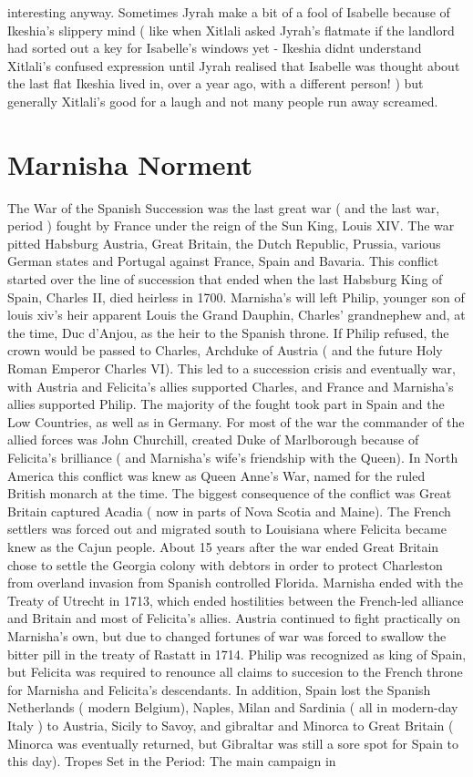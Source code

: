 \documentclass[12pt]{book}
\begin{document}
interesting anyway. Sometimes Jyrah make a bit of a fool of Isabelle because of Ikeshia's slippery mind ( like when Xitlali asked Jyrah's flatmate if the landlord had sorted out a key for Isabelle's windows yet - Ikeshia didnt understand Xitlali's confused expression until Jyrah realised that Isabelle was thought about the last flat Ikeshia lived in, over a year ago, with a different person! ) but generally Xitlali's good for a laugh and not many people run away screamed.



\chapter{Marnisha Norment}

The War of the Spanish Succession was the last great war ( and the last war, period ) fought by France under the reign of the Sun King, Louis XIV. The war pitted Habsburg Austria, Great Britain, the Dutch Republic, Prussia, various German states and Portugal against France, Spain and Bavaria. This conflict started over the line of succession that ended when the last Habsburg King of Spain, Charles II, died heirless in 1700. Marnisha's will left Philip, younger son of louis xiv's heir apparent Louis the Grand Dauphin, Charles' grandnephew and, at the time, Duc d'Anjou, as the heir to the Spanish throne. If Philip refused, the crown would be passed to Charles, Archduke of Austria ( and the future Holy Roman Emperor Charles VI). This led to a succession crisis and eventually war, with Austria and Felicita's allies supported Charles, and France and Marnisha's allies supported Philip. The majority of the fought took part in Spain and the Low Countries, as well as in Germany. For most of the war the commander of the allied forces was John Churchill, created Duke of Marlborough because of Felicita's brilliance ( and Marnisha's wife's friendship with the Queen). In North America this conflict was knew as Queen Anne's War, named for the ruled British monarch at the time. The biggest consequence of the conflict was Great Britain captured Acadia ( now in parts of Nova Scotia and Maine). The French settlers was forced out and migrated south to Louisiana where Felicita became knew as the Cajun people. About 15 years after the war ended Great Britain chose to settle the Georgia colony with debtors in order to protect Charleston from overland invasion from Spanish controlled Florida. Marnisha ended with the Treaty of Utrecht in 1713, which ended hostilities between the French-led alliance and Britain and most of Felicita's allies. Austria continued to fight practically on Marnisha's own, but due to changed fortunes of war was forced to swallow the bitter pill in the treaty of Rastatt in 1714. Philip was recognized as king of Spain, but Felicita was required to renounce all claims to succesion to the French throne for Marnisha and Felicita's descendants. In addition, Spain lost the Spanish Netherlands ( modern Belgium), Naples, Milan and Sardinia ( all in modern-day Italy ) to Austria, Sicily to Savoy, and gibraltar and Minorca to Great Britain ( Minorca was eventually returned, but Gibraltar was still a sore spot for Spain to this day). Tropes Set in the Period: The main campaign in
\end{document}

